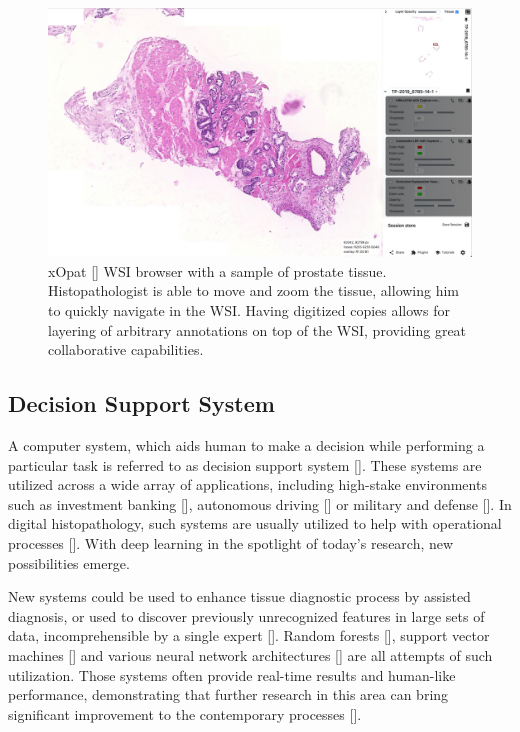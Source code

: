 \begin{figure}[!h]
    \begin{center}
    \begin{minipage}{0.75\textwidth}
      \includegraphics[width=\textwidth]{img/xopat.png}
    \end{minipage}
    \caption{xOpat [] WSI browser with a sample of prostate tissue. Histopathologist is able to move and zoom the tissue, allowing him to quickly navigate in the WSI. Having digitized copies allows for layering of arbitrary annotations on top of the WSI, providing great collaborative capabilities.}
    \label{fig:xopat}
    \end{center}
\end{figure}

\subsection*{Decision Support System}

A computer system, which aids human to make a decision while performing a particular task is referred to as decision support system []. These systems are utilized across a wide array of applications, including high-stake environments such as investment banking [], autonomous driving [] or military and defense []. In digital histopathology, such systems are usually utilized to help with operational processes []. With deep learning in the spotlight of today's research, new possibilities emerge.

New systems could be used to enhance tissue diagnostic process by assisted diagnosis, or used to discover previously unrecognized features in large sets of data, incomprehensible by a single expert [].
Random forests [], support vector machines [] and various neural network architectures [] are all attempts of such utilization. Those systems often provide real-time results and human-like performance, demonstrating that further research in this area can bring significant improvement to the contemporary processes [].

